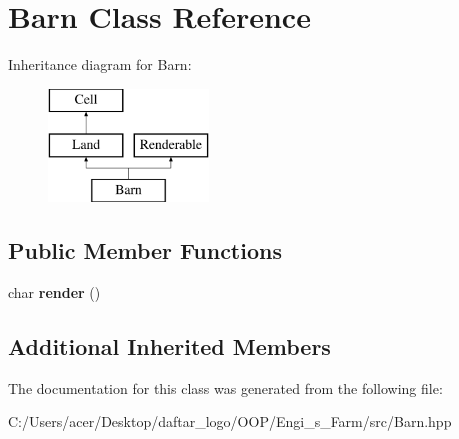 \hypertarget{class_barn}{}\section{Barn Class Reference}
\label{class_barn}
Inheritance diagram for Barn\+:\begin{figure}[H]
\begin{center}
\leavevmode
\includegraphics[height=3.000000cm]{class_barn}
\end{center}
\end{figure}
\subsection*{Public Member Functions}
\begin{DoxyCompactItemize}
\item 
\mbox{\label{class_barn_a01118cf6372344557544a94ac0185d44}} 
char {\bfseries render} ()
\end{DoxyCompactItemize}
\subsection*{Additional Inherited Members}


The documentation for this class was generated from the following file\+:\begin{DoxyCompactItemize}
\item 
C\+:/\+Users/acer/\+Desktop/daftar\+\_\+logo/\+O\+O\+P/\+Engi\+\_\+s\+\_\+\+Farm/src/Barn.\+hpp\end{DoxyCompactItemize}
